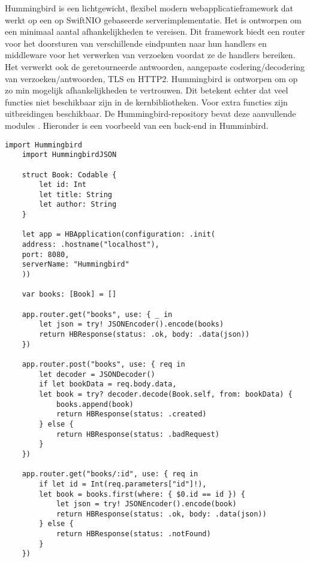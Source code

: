 Hummingbird is een lichtgewicht, flexibel modern webapplicatieframework dat werkt op een op SwiftNIO gebaseerde serverimplementatie. Het is ontworpen om een minimaal aantal afhankelijkheden te vereisen. Dit framework biedt een router voor het doorsturen van verschillende eindpunten naar hun handlers en \\middleware voor het verwerken van verzoeken voordat ze de handlers bereiken. Het verwerkt ook de geretourneerde antwoorden, aangepaste codering/decodering van verzoeken/antwoorden, TLS en HTTP2.
Hummingbird is ontworpen om op zo min mogelijk afhankelijkheden te vertrouwen. Dit betekent echter dat veel \\functies niet beschikbaar zijn in de kernbibliotheken. Voor extra functies zijn uitbreidingen beschikbaar. De Hummingbird-repository bevat deze aanvullende \\modules  \autocite{2024}.
Hieronder is een voorbeeld van een back-end in Humminbird. 
\begin{lstlisting}[caption=Himmingbird example]
    import Hummingbird
    import HummingbirdJSON
    
    struct Book: Codable {
        let id: Int
        let title: String
        let author: String
    }
    
    let app = HBApplication(configuration: .init(
    address: .hostname("localhost"),
    port: 8080,
    serverName: "Hummingbird"
    ))
    
    var books: [Book] = []
    
    app.router.get("books", use: { _ in
        let json = try! JSONEncoder().encode(books)
        return HBResponse(status: .ok, body: .data(json))
    })
    
    app.router.post("books", use: { req in
        let decoder = JSONDecoder()
        if let bookData = req.body.data,
        let book = try? decoder.decode(Book.self, from: bookData) {
            books.append(book)
            return HBResponse(status: .created)
        } else {
            return HBResponse(status: .badRequest)
        }
    })
    
    app.router.get("books/:id", use: { req in
        if let id = Int(req.parameters["id"]!),
        let book = books.first(where: { $0.id == id }) {
            let json = try! JSONEncoder().encode(book)
            return HBResponse(status: .ok, body: .data(json))
        } else {
            return HBResponse(status: .notFound)
        }
    })
\end{lstlisting}

